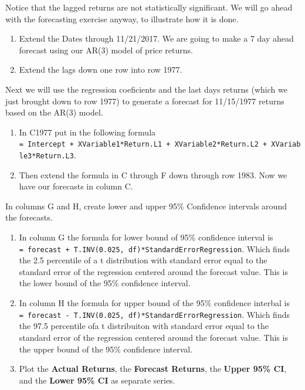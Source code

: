 \documentclass[
]{book}
\begin{document}
Notice that the lagged returns are not statistically significant. We will go ahead with the forecasting exercise anyway, to illustrate how it is done.

\begin{enumerate}
\def\labelenumi{\arabic{enumi}.}
\setcounter{enumi}{5}
\item
  Extend the Dates through 11/21/2017. We are going to make a 7 day ahead forecast using our AR(3) model of price returns.
\item
  Extend the lags down one row into row 1977.
\end{enumerate}

Next we will use the regression coeficients and the last days returns (which we just brought down to row 1977) to generate a forecast for 11/15/1977 returns based on the AR(3) model.

\begin{enumerate}
\def\labelenumi{\arabic{enumi}.}
\setcounter{enumi}{7}
\item
  In C1977 put in the following formula \texttt{=\ Intercept\ +\ XVariable1*Return.L1\ +\ XVariable2*Return.L2\ +\ XVariable3*Return.L3}.
\item
  Then extend the formula in C through F down through row 1983. Now we have our forecasts in column C.
\end{enumerate}

In columns G and H, create lower and upper 95\% Confidence intervals around the forecasts.

\begin{enumerate}
\def\labelenumi{\arabic{enumi}.}
\setcounter{enumi}{9}
\item
  In column G the formula for lower bound of 95\% confidence interval is \texttt{=\ forecast\ +\ T.INV(0.025,\ df)*StandardErrorRegression}. Which finds the 2.5 percentile of a t distribution with standard error equal to the standard error of the regression centered around the forecast value. This is the lower bound of the 95\% confidence interval.
\item
  In column H the formula for upper bound of the 95\% confidence interbal is \texttt{=\ forecast\ -\ T.INV(0.025,\ df)*StandardErrorRegression}. Which finds the 97.5 percentile ofa t distribuiton with standard error equal to the standard error of the regression centered around the forecast value. This is the upper bound of the 95\% confidence interval.
\item
  Plot the \textbf{Actual Returns}, the \textbf{Forecast Returns}, the \textbf{Upper 95\% CI}, and the \textbf{Lower 95\% CI} as separate series.
\end{enumerate}
\end{document}
